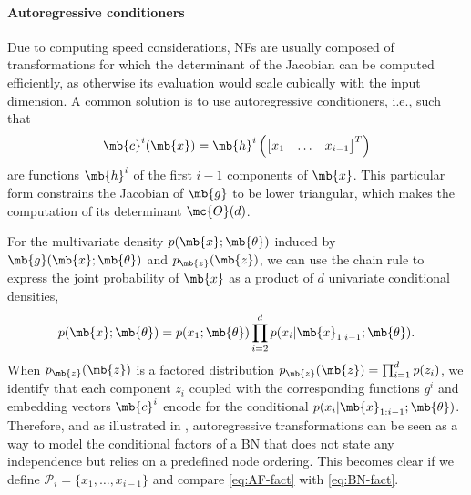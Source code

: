 
\paragraph{Autoregressive conditioners}
Due to computing speed considerations, NFs are usually composed of transformations for which the determinant of the Jacobian can be computed efficiently, as otherwise its evaluation would scale cubically with the input dimension.
A common solution is to use autoregressive conditioners, i.e., such that
$$\mb{c}^i(\mb{x}) = \mb{h}^i\left(\begin{bmatrix} x_1 & \hdots & x_{i-1} \end{bmatrix}^T\right)$$ are functions $\mb{h}^i$ of the first $i-1$ components of $\mb{x}$. This particular form constrains the Jacobian of $\mb{g}$ to be lower triangular, which makes the computation of its determinant $\mc{O}(d)$.

For the multivariate density $p(\mb{x}; \mb{\theta})$ induced by $\mb{g}(\mb{x};\mb{\theta})$ and $p_{\mb{z}}(\mb{z})$, we can use the chain rule to express the joint probability of $\mb{x}$ as a product of $d$ univariate conditional densities,
\begin{align}
    p(\mb{x}; \mb{\theta}) = p(x_1; \mb{\theta})\prod^{d}_{i=2}p(x_{i}|\mb{x}_{1:i-1}; \mb{\theta}). \label{eq:AF-fact}
\end{align}
When $p_{\mb{z}}(\mb{z})$ is a factored distribution $p_{\mb{z}}(\mb{z}) = \prod^{d}_{i=1}p(z_i)$, we identify that each component $z_i$ coupled with the corresponding functions $g^i$ and embedding vectors $\mb{c}^i$ encode for the conditional $p(x_{i}|\mb{x}_{1:i-1}; \mb{\theta})$. Therefore, and as illustrated in , autoregressive transformations can be seen as a way to model the conditional factors of a BN that does not state any independence but relies on a predefined node ordering. This becomes clear if we define $\mathcal{P}_i = \{x_1, \hdots, x_{i-1}\}$ and compare \eqref{eq:AF-fact} with \eqref{eq:BN-fact}.

